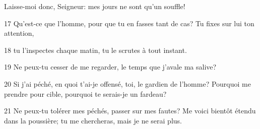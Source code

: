 Laisse-moi donc, Seigneur: mes jours ne sont qu’un souffle!

17 Qu’est-ce que l’homme, pour que tu en fasses tant de cas? Tu fixes sur lui ton attention,

18 tu l’inspectes chaque matin, tu le scrutes à tout instant.

19 Ne peux-tu cesser de me regarder, le temps que j’avale ma salive?

20 Si j’ai péché, en quoi t’ai-je offensé, toi, le gardien de l’homme? Pourquoi me prendre pour cible, pourquoi te serais-je un fardeau?

21 Ne peux-tu tolérer mes péchés, passer sur mes fautes? Me voici bientôt étendu dans la poussière; tu me chercheras, mais je ne serai plus.